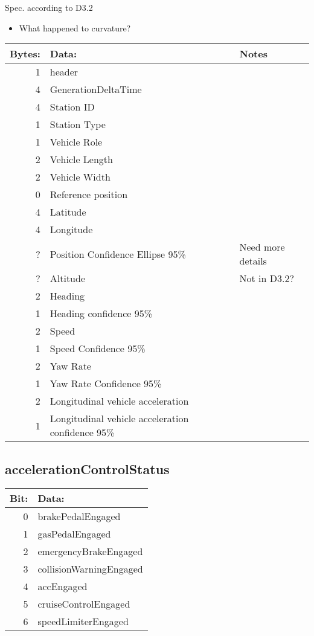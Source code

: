 \documentclass[11pt]{article}
\begin{document}
Spec. according to D3.2
\begin{itemize}
\item What happened to curvature?
\end{itemize}
\begin{center}
\begin{tabular}{rll}
Bytes: & Data: & Notes\\
\hline
1 & header & \\
4 & GenerationDeltaTime & \\
4 & Station ID & \\
1 & Station Type & \\
1 & Vehicle Role & \\
2 & Vehicle Length & \\
2 & Vehicle Width & \\
0 & Reference position & \\
4 & Latitude & \\
4 & Longitude & \\
? & Position Confidence Ellipse 95\% & Need more details\\
? & Altitude & Not in D3.2?\\
2 & Heading & \\
1 & Heading confidence 95\% & \\
2 & Speed & \\
1 & Speed Confidence 95\% & \\
2 & Yaw Rate & \\
1 & Yaw Rate Confidence 95\% & \\
2 & Longitudinal vehicle acceleration & \\
1 & Longitudinal vehicle acceleration confidence 95\% & \\
\end{tabular}
\end{center}



\subsection{accelerationControlStatus}
\label{sec:orgheadline2}
\begin{center}
\begin{tabular}{rl}
\hline
Bit: & Data:\\
\hline
0 & brakePedalEngaged\\
1 & gasPedalEngaged\\
2 & emergencyBrakeEngaged\\
3 & collisionWarningEngaged\\
4 & accEngaged\\
5 & cruiseControlEngaged\\
6 & speedLimiterEngaged\\
\end{tabular}
\end{center}
\end{document}
